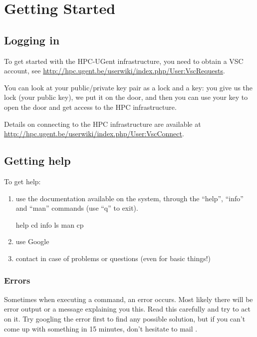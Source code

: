 \chapter{Getting Started}

\section{Logging in}

To get started with the HPC-UGent infrastructure, you need to obtain a VSC
account, see \url{http://hpc.ugent.be/userwiki/index.php/User:VscRequests}.


You can look at your public/private key pair as a lock and a key: you give us
the lock (your public key), we put it on the door, and then you can use your
key to open the door and get access to the HPC infrastructure. 

Details on connecting to the HPC infrastructure are available at
\url{http://hpc.ugent.be/userwiki/index.php/User:VscConnect}.

\section{Getting help}

To get help:

\begin{enumerate}
  \item use the documentation available on the system, through the ``help'',
    ``info'' and ``man'' commands (use ``q'' to exit).

\begin{prompt}
  help cd
  info ls
  man cp
\end{prompt}

  \item use Google
  \item contact \hpcinfo in case of problems or questions (even for basic
    things!)
\end{enumerate}

\subsection{Errors}

Sometimes when executing a command, an error occurs. Most likely there will be
error output or a message explaining you this. Read this carefully and try to
act on it. Try googling the error first to find any possible solution, but if
you can't come up with something in 15 minutes, don't hesitate to mail
\hpcinfo.


